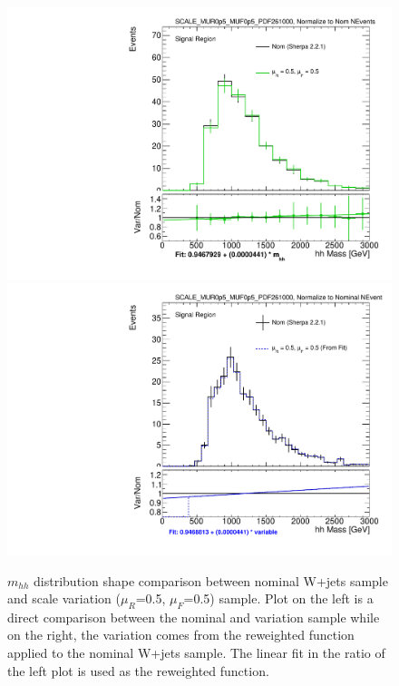 \begin{figure}[!htbp]
\begin{center}
\includegraphics[scale=0.33]{./figures/boosted/systematics/wjets_alt_hhMass_SR_syst_SCALE_MUR0p5_MUF0p5_PDF261000}
\includegraphics[scale=0.33]{./figures/boosted/systematics/wjets_fromfit_hhMass_SR_SCALE_MUR0p5_MUF0p5_PDF261000} \\
\caption[$m_{hh}$ distribution shape comparison between nominal W+jets sample and scale variation ($\mu_{R}$=0.5, $\mu_{F}$=0.5) sample]{$m_{hh}$ distribution shape comparison between nominal W+jets sample and scale variation ($\mu_{R}$=0.5, $\mu_{F}$=0.5) sample. Plot on the left is a direct
comparison between the nominal and variation sample while on the right, the variation comes from the reweighted function applied to the nominal W+jets sample. The linear fit
in the ratio of the left plot is used as the reweighted function.}
\label{fig:boosted_unc_wjets_sr_scale_fit}
\end{center}
\end{figure}
 
